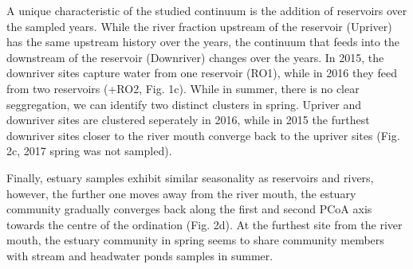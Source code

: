 \documentclass[12pt,a4paper]{article} %
\begin{document}
A unique characteristic of the studied continuum is the addition of reservoirs over the sampled years. While the river fraction upstream of the reservoir (Upriver) has the same upstream history over the years, the continuum that feeds into the downstream of the reservoir (Downriver) changes over the years. In 2015, the downriver sites capture water from one reservoir (RO1), while in 2016 they feed from two reservoirs (+RO2, Fig. 1c). While in summer, there is no clear seggregation, we can identify two distinct clusters in spring. Upriver and downriver sites are clustered seperately in 2016, while in 2015 the furthest downriver sites closer to the river mouth converge back to the upriver sites (Fig. 2c, 2017 spring was not sampled).

Finally, estuary samples exhibit similar seasonality as reservoirs and rivers, however, the further one moves away from the river mouth, the estuary community gradually converges back along the first and second PCoA axis towards the centre of the ordination (Fig. 2d). At the furthest site from the river mouth, the estuary community in spring seems to share community members with stream and headwater ponds samples in summer.
\end{document}
